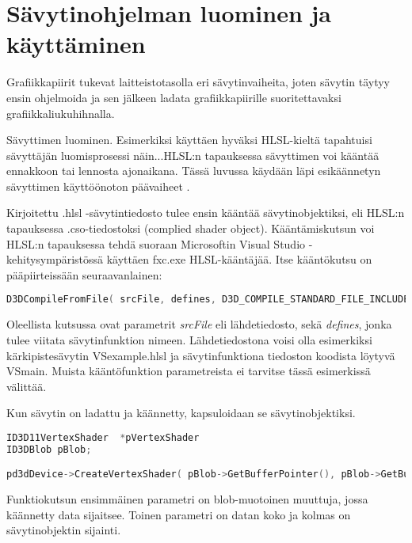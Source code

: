 \documentclass[finnish]{tktltiki2}
\theoremstyle{definition}
\theoremstyle{remark}
\begin{document}
\section{Sävytinohjelman luominen ja käyttäminen}

Grafiikkapiirit tukevat laitteistotasolla eri sävytinvaiheita, joten sävytin täytyy ensin ohjelmoida ja sen jälkeen ladata grafiikkapiirille suoritettavaksi grafiikkaliukuhihnalla.

Sävyttimen luominen. Esimerkiksi käyttäen hyväksi HLSL-kieltä tapahtuisi sävyttäjän luomisprosessi näin...HLSL:n tapauksessa sävyttimen voi kääntää ennakkoon tai lennosta ajonaikana. Tässä luvussa käydään läpi esikäännetyn sävyttimen käyttöönoton päävaiheet \cite{Mic15}.

Kirjoitettu .hlsl -sävytintiedosto tulee ensin kääntää sävytinobjektiksi, eli HLSL:n tapauksessa .cso-tiedostoksi (complied shader object). Kääntämiskutsun voi HLSL:n tapauksessa tehdä suoraan Microsoftin Visual Studio -kehitysympäristössä käyttäen fxc.exe HLSL-kääntäjää. Itse kääntökutsu on pääpiirteissään seuraavanlainen:

\lstset{breaklines=true}
\begin{lstlisting}[language=c++, basicstyle = \small]
D3DCompileFromFile( srcFile, defines, D3D_COMPILE_STANDARD_FILE_INCLUDE, entryPoint, profile, flags, 0, &shaderBlob, &errorBlob );
\end{lstlisting}

Oleellista kutsussa ovat parametrit \emph{srcFile} eli lähdetiedosto, sekä \emph{defines}, jonka tulee viitata sävytinfunktion nimeen. Lähdetiedostona voisi olla esimerkiksi kärkipistesävytin VSexample.hlsl ja sävytinfunktiona tiedoston koodista löytyvä VSmain. Muista kääntöfunktion parametreista ei tarvitse tässä esimerkissä välittää.

Kun sävytin on ladattu ja käännetty, kapsuloidaan se sävytinobjektiksi.

\lstset{breaklines=true}
\begin{lstlisting}[language=c++, basicstyle = \footnotesize]
ID3D11VertexShader  *pVertexShader
ID3DBlob pBlob;

pd3dDevice->CreateVertexShader( pBlob->GetBufferPointer(), pBlob->GetBufferSize(), &ppVertexShader );

\end{lstlisting}

Funktiokutsun ensimmäinen parametri on blob-muotoinen muuttuja, jossa käännetty data sijaitsee. Toinen parametri on datan koko ja kolmas on sävytinobjektin sijainti.
\end{document}
